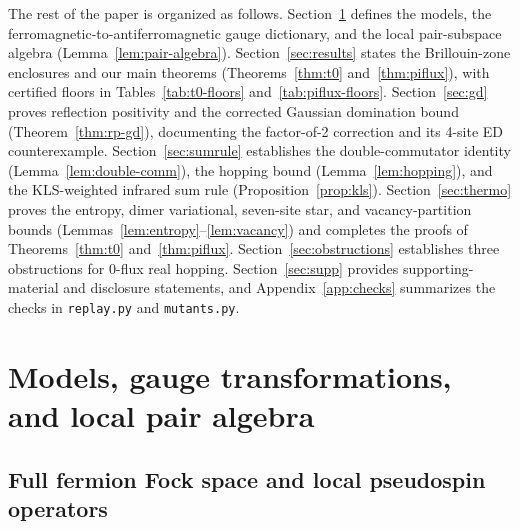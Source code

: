 \documentclass[11pt]{article}
\theoremstyle{definition}
\theoremstyle{remark}
\begin{document}
The rest of the paper is organized as follows. Section~\ref{sec:model} defines the models, the ferromagnetic-to-antiferromagnetic gauge dictionary, and the local pair-subspace algebra (Lemma~\ref{lem:pair-algebra}). Section~\ref{sec:results} states the Brillouin-zone enclosures and our main theorems (Theorems~\ref{thm:t0} and~\ref{thm:piflux}), with certified floors in Tables~\ref{tab:t0-floors} and~\ref{tab:piflux-floors}. Section~\ref{sec:gd} proves reflection positivity and the corrected Gaussian domination bound (Theorem~\ref{thm:rp-gd}), documenting the factor-of-2 correction and its 4-site ED counterexample. Section~\ref{sec:sumrule} establishes the double-commutator identity (Lemma~\ref{lem:double-comm}), the hopping bound (Lemma~\ref{lem:hopping}), and the KLS-weighted infrared sum rule (Proposition~\ref{prop:kls}). Section~\ref{sec:thermo} proves the entropy, dimer variational, seven-site star, and vacancy-partition bounds (Lemmas~\ref{lem:entropy}--\ref{lem:vacancy}) and completes the proofs of Theorems~\ref{thm:t0} and~\ref{thm:piflux}. Section~\ref{sec:obstructions} establishes three obstructions for $0$-flux real hopping. Section~\ref{sec:supp} provides supporting-material and disclosure statements, and Appendix~\ref{app:checks} summarizes the checks in \texttt{replay.py} and \texttt{mutants.py}.

\section{Models, gauge transformations, and local pair algebra}\label{sec:model}

\subsection{Full fermion Fock space and local pseudospin operators}\label{subsec:fock}
\end{document}
